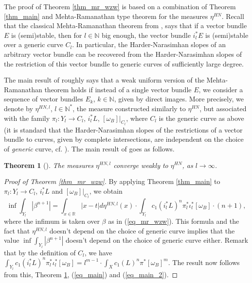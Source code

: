 \documentclass[12pt]{article}
\numberwithin{equation}{section}
\theoremstyle{theorem}
\newtheorem{thm}{Theorem}[section]
\theoremstyle{definition}
\theoremstyle{remark}
\newcommand{\real}{\mathbb{R}}
\newcommand{\nat}{\mathbb{N}}
\begin{document}
	\par 
	The proof of Theorem \ref{thm_mr_wzw} is based on a combination of Theorem \ref{thm_main} and Mehta-Ramanathan type theorem for the measures $\eta^{HN}$.
	Recall that the classical Mehta-Ramanathan theorem from \cite{MehtaRamMathAnn}, \cite{MehtaRama} says that if a vector bundle $E$ is (semi)stable, then for $l \in \nat$ big enough, the vector bundle $i_l^* E$ is (semi)stable over a generic curve $C_l$.
	In particular, the Harder-Narasimhan slopes of an arbitrary vector bundle can be recovered from the Harder-Narasimhan slopes of the restriction of this vector bundle to generic curves of sufficiently large degree.
	\par 
	The main result of \cite{FinHNI} roughly says that a weak uniform version of the Mehta-Ramanathan theorem holds if instead of a single vector bundle $E$, we consider a sequence of vector bundles $E_k$, $k \in \nat$, given by direct images.
	More precisely, we denote by $\eta^{HN, l}$, $l \in \nat^*$, the measure constructed similarly to $\eta^{HN}$, but associated with the family $\pi_l: Y_l \to C_l$, $i_l^* L$, $[\omega_B]|_{C_l}$, where $C_l$ is the generic curve as above (it is standard that the Harder-Narasimhan slopes of the restrictions of a vector bundle to curves, given by complete intersections, are independent on the choice of \textit{generic} curve, cf. \cite[Corollary 3.8]{FinHNI}).
	The main result of \cite{FinHNI} goes as follows.
	\begin{thm}[{\cite[Theorem 1.2]{FinHNI}}]\label{thm_mr_HN}
		The measures $\eta^{HN, l}$ converge weakly to $\eta^{HN}$, as $l \to \infty$.
	\end{thm}
	\par 
	\begin{sloppypar}
	\begin{proof}[Proof of Theorem \ref{thm_mr_wzw}]
		By applying Theorem \ref{thm_main} to $\pi_l: Y_l \to C_l$, $i_l^* L$ and $[\omega_B]|_{C_l}$, we obtain
		\begin{equation}\label{eq_main_2}
			\inf \int_{Y_l} |\beta^{n + 1}| = \int_{x \in \real} |x - t| d \eta^{HN, l}(x)
			\cdot
			\int_{Y_l} c_1(i_l^* L)^n \pi_l^* \iota_l^* [\omega_B]
			\cdot
			(n + 1),
		\end{equation}
		where the infimum is taken over $\beta$ as in (\ref{eq_mr_wzw}).
		This formula and the fact that $\eta^{HN, l}$ doesn't depend on the choice of generic curve implies that the value $\inf \int_{Y_l} |\beta^{n + 1}|$ doesn't depend on the choice of generic curve either.
		Remark that by the definition of $C_l$, we have $\int_{Y_l} c_1(i_l^* L)^n \pi_l^* \iota_l^* [\omega_B] = l^{m - 1} \cdot \int_X c_1(L)^n \pi^* [\omega_B]^m$.
		The result now follows from this, Theorem \ref{thm_mr_HN}, (\ref{eq_main}) and (\ref{eq_main_2}).
	\end{proof}		
	\end{sloppypar}
	
\end{document}

